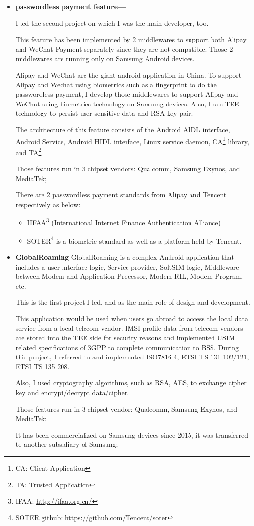 \documentclass{article}
\begin{document}
\begin{itemize}
\item{\textbf{passwordless payment feature---}}

I led the second project on which I was the main developer, too.

This feature has been implemented by 2 middlewares to support both Alipay and WeChat Payment separately since they are not compatible.
Those 2 middlewares are running only on Samsung Android devices.

Alipay and WeChat are the giant android application in China.
To support Alipay and Wechat using biometrics such as a fingerprint to do the passwordless payment,
I develop those middlewares to support Alipay and WeChat using biometrics technology on Samsung devices.
Also, I use TEE technology to persist user sensitive data and RSA key-pair.

The architecture of this feature consists of the Android AIDL interface, Android Service, Android HIDL interface, Linux service daemon, CA\footnote{CA: Client Application} library, and TA\footnote{TA: Trusted Application}.

Those features run in 3 chipset vendors: Qualcomm, Samsung Exynos, and MediaTek;

There are 2 passwordless payment standards from Alipay and Tencent respectively as below:

\begin{itemize}
\item[1]{IIFAA}\footnote{IFAA: \url{http://ifaa.org.cn/}}
(International Internet Finance Authentication Alliance)

\item[2]{SOTER}\footnote{SOTER github: \url{https://github.com/Tencent/soter}}
is a biometric standard as well as a platform held by Tencent.
\end{itemize}

\item{\textbf{GlobalRoaming}}
GlobalRoaming is a complex Android application that includes a user interface logic, Service provider, SoftSIM logic, Middleware between Modem and Application Processor, Modem RIL, Modem Program, etc.

This is the first project I led, and as the main role of design and development.

This application would be used when users go abroad to access the local data service from a local telecom vendor.
IMSI profile data from telecom vendors are stored into the TEE side for security reasons and implemented USIM related specifications of 3GPP to complete communication to BSS.
During this project, I referred to and implemented ISO7816-4, ETSI TS 131-102/121, ETSI TS 135 208.

Also, I used cryptography algorithms, such as RSA, AES, to exchange cipher key and encrypt/decrypt data/cipher.

Those features run in 3 chipset vendor: Qualcomm, Samsung Exynos, and MediaTek;

It has been commercialized on Samsung devices since 2015, it was transferred to another subsidiary of Samsung;


\end{itemize}
\end{document}
